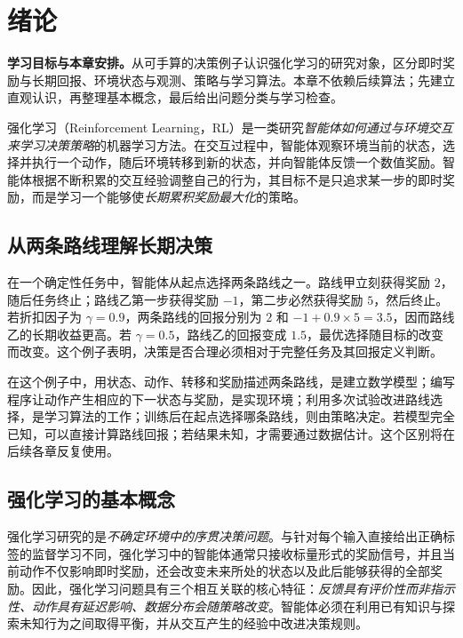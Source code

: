 \setcounter{chapter}{0} %
\chapter{绪论}
\label{ch:rl-introduction}

\textbf{学习目标与本章安排。}从可手算的决策例子认识强化学习的研究对象，区分即时奖励与长期回报、环境状态与观测、策略与学习算法。本章不依赖后续算法；先建立直观认识，再整理基本概念，最后给出问题分类与学习检查。

强化学习（Reinforcement Learning，RL）是一类研究\emph{智能体如何通过与环境交互来学习决策策略}的机器学习方法。在交互过程中，智能体观察环境当前的状态，选择并执行一个动作，随后环境转移到新的状态，并向智能体反馈一个数值奖励。智能体根据不断积累的交互经验调整自己的行为，其目标不是只追求某一步的即时奖励，而是学习一个能够使\emph{长期累积奖励最大化}的策略。

\section{从两条路线理解长期决策}

\begin{example}[先付出代价是否值得]
在一个确定性任务中，智能体从起点选择两条路线之一。路线甲立刻获得奖励 $2$，随后任务终止；路线乙第一步获得奖励 $-1$，第二步必然获得奖励 $5$，然后终止。若折扣因子为 $\gamma=0.9$，两条路线的回报分别为 $2$ 和 $-1+0.9\times5=3.5$，因而路线乙的长期收益更高。若 $\gamma=0.5$，路线乙的回报变成 $1.5$，最优选择随目标的改变而改变。这个例子表明，决策是否合理必须相对于完整任务及其回报定义判断。
\end{example}

在这个例子中，用状态、动作、转移和奖励描述两条路线，是建立数学模型；编写程序让动作产生相应的下一状态与奖励，是实现环境；利用多次试验改进路线选择，是学习算法的工作；训练后在起点选择哪条路线，则由策略决定。若模型完全已知，可以直接计算路线回报；若结果未知，才需要通过数据估计。这个区别将在后续各章反复使用。


\section{强化学习的基本概念}


强化学习研究的是\emph{不确定环境中的序贯决策问题}。与针对每个输入直接给出正确标签的监督学习不同，强化学习中的智能体通常只接收标量形式的奖励信号，并且当前动作不仅影响即时奖励，还会改变未来所处的状态以及此后能够获得的全部奖励。因此，强化学习问题具有三个相互关联的核心特征：\emph{反馈具有评价性而非指示性、动作具有延迟影响、数据分布会随策略改变}。智能体必须在利用已有知识与探索未知行为之间取得平衡，并从交互产生的经验中改进决策规则。


